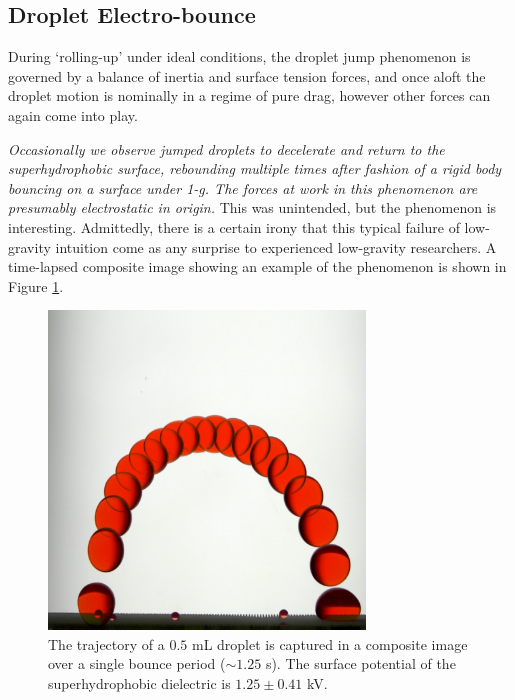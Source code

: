 \documentclass[10pt,a4paper]{article}
\begin{document}
\subsection{Droplet Electro-bounce}
During `rolling-up' under ideal conditions, the droplet jump phenomenon is governed by a balance of inertia and surface tension forces, and once aloft the droplet motion is nominally in a regime of pure drag, however other forces can again come into play. 

\emph{Occasionally we observe jumped droplets to decelerate and return to the superhydrophobic surface, rebounding multiple times after fashion of a rigid body bouncing on a surface under 1-g. The forces at work in this phenomenon are presumably electrostatic in origin.} This was unintended, but the phenomenon is interesting. Admittedly, there is a certain irony that this typical failure of low-gravity intuition come as any surprise to experienced low-gravity researchers. A time-lapsed composite image showing an example of the phenomenon is shown in Figure \ref{fig:bounce}.  

\newpage
\begin{figure}[htb]
\centering
\includegraphics[width=0.75\textwidth]{bounce}
\caption{The trajectory of a $0.5$ mL droplet is captured in a composite image over a single bounce period ($\sim 1.25$ s). The surface potential of the superhydrophobic dielectric is $1.25 \pm 0.41$ kV. \label{fig:bounce}}
\end{figure}
\end{document}
